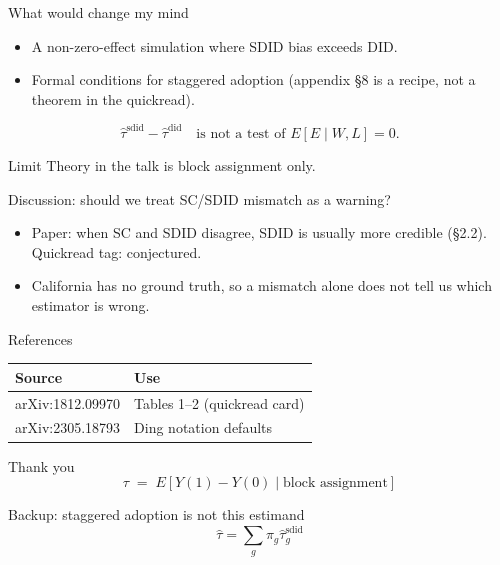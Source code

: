 \documentclass[aspectratio=169,10pt]{beamer}
\begin{document}
\begin{frame}{What would change my mind}
  \begin{itemize}
    \item A non-zero-effect simulation where SDID bias exceeds DID.
    \item Formal conditions for staggered adoption (appendix §8 is a
      recipe, not a theorem in the quickread).
  \end{itemize}
  \begin{equation*}
    \hat\tau^{\mathrm{sdid}} - \hat\tau^{\mathrm{did}}
    \quad\text{is not a test of } E[E\mid W,L]=0.
  \end{equation*}
  \begin{block}{Limit}
    Theory in the talk is block assignment only.
  \end{block}
\end{frame}

\begin{frame}{Discussion: should we treat SC/SDID mismatch as a warning?}
  \begin{itemize}
    \item Paper: when SC and SDID disagree, SDID is usually more
      credible (§2.2). Quickread tag: conjectured.
    \item California has no ground truth, so a mismatch alone does not
      tell us which estimator is wrong.
  \end{itemize}
\end{frame}

\begin{frame}{References}
  \vspace{4pt}
  \begin{tabular}{ll}
    \toprule
    Source & Use \\
    \midrule
    arXiv:1812.09970 & Tables 1--2 (quickread card) \\
    arXiv:2305.18793 & Ding notation defaults \\
    \bottomrule
  \end{tabular}
\end{frame}

\begin{frame}{Thank you}
  \begin{equation*}
    \tau \;=\; E[Y(1)-Y(0)\mid \text{block assignment}]
  \end{equation*}
\end{frame}

\appendix
\begin{frame}{Backup: staggered adoption is not this estimand}
  \begin{equation*}
    \hat\tau = \sum_{g} \pi_g \hat\tau_g^{\mathrm{sdid}}
  \end{equation*}
\end{frame}
\end{document}
